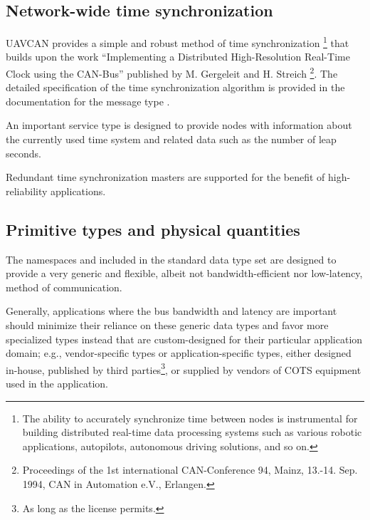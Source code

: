 
\subsection{Network-wide time synchronization}

UAVCAN provides a simple and robust method of time synchronization%
\footnote{The ability to accurately synchronize time between nodes is instrumental for building distributed
real-time data processing systems such as various robotic applications, autopilots, autonomous driving solutions,
and so on.} that builds upon the work
``Implementing a Distributed High-Resolution Real-Time Clock using the CAN-Bus''
published by M. Gergeleit and H. Streich%
\footnote{Proceedings of the 1st international CAN-Conference 94, Mainz,
13.-14. Sep. 1994, CAN in Automation e.V., Erlangen.}.
The detailed specification of the time synchronization algorithm is provided in the documentation
for the message type .

An important service type 
is designed to provide nodes with information about the currently used time system
and related data such as the number of leap seconds.

Redundant time synchronization masters are supported for the benefit of high-reliability applications.


\subsection{Primitive types and physical quantities}

The namespaces  and 
included in the standard data type set are designed to provide a very generic and flexible,
albeit not bandwidth-efficient nor low-latency, method of communication.

Generally, applications where the bus bandwidth and latency are important should minimize their reliance
on these generic data types and favor more specialized types instead that are custom-designed for their
particular application domain; e.g., vendor-specific types or application-specific types, either
designed in-house, published by third parties\footnote{As long as the license permits.}, or supplied by
vendors of COTS equipment used in the application.


